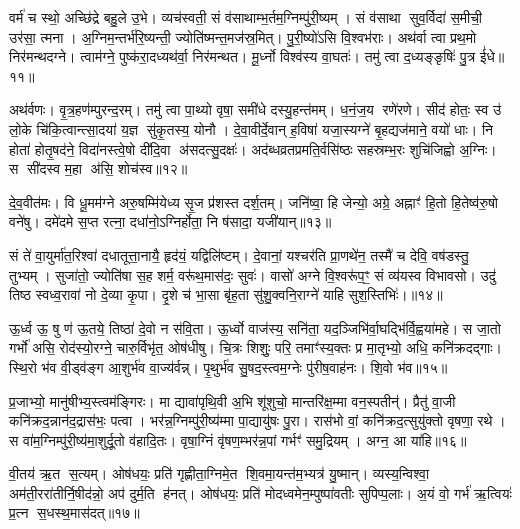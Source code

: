वर्म॑ च स्थो॒ अच्छि॑द्रे बहु॒ले उ॒भे। व्यच॑स्वती॒ सं व॑साथाम्भ॒र्तम॒ग्निम्पु॑री॒ष्यम्। सं व॑साथा सुव॒र्विदा॑ स॒मीची॒ उर॑सा॒ त्मना। अ॒ग्निम॒न्तर्भ॑रि॒ष्यन्ती॒ ज्योति॑ष्मन्त॒मज॑स्र॒मित्। पु॒री॒ष्यो॑ऽसि वि॒श्वभ॑राः। अथ॑र्वा त्वा प्रथ॒मो निर॑मन्थदग्ने। त्वाम॑ग्ने॒ पुष्क॑रा॒दध्यथ॑र्वा॒ निर॑मन्थत। मू॒र्ध्नो विश्व॑स्य वा॒घतः॑। तमु॑ त्वा द॒ध्यङ्ङृषिः॑ पु॒त्र ई॑धे॥११॥

अथ॑र्वणः। वृ॒त्र॒हण॑म्पुरन्द॒रम्। तमु॑ त्वा पा॒थ्यो वृषा॒ समी॑धे दस्यु॒हन्त॑मम्। ध॒नं॒ज॒य रणे॑रणे। सीद॑ होतः॒ स्व उ॑ लो॒के चि॑कि॒त्वान्त्सा॒दया॑ य॒ज्ञ सु॑कृ॒तस्य॒ योनौ। दे॒वा॒वीर्दे॒वान् ह॒विषा॑ यजा॒स्यग्ने॑ बृ॒हद्यज॑माने॒ वयो॑ धाः। नि होता॑ होतृ॒षद॑ने॒ विदा॑नस्त्वे॒षो दी॑दि॒वा अ॑सदत्सु॒दक्षः॑। अद॑ब्धव्रतप्रमति॒र्वसि॑ष्ठः सहस्रम्भ॒रः शुचि॑जिह्वो अ॒ग्निः। स सी॑दस्व म॒हा अ॑सि॒ शोच॑स्व॥१२॥

दे॒व॒वीत॑मः। वि धू॒मम॑ग्ने अरु॒षम्मि॑येध्य सृ॒ज प्र॑शस्त दर्\mbox{}श॒तम्। जनि॑ष्वा॒ हि जेन्यो॒ अग्रे॒ अह्नाꣳ॑ हि॒तो हि॒तेष्व॑रु॒षो वने॑षु। दमे॑दमे स॒प्त रत्ना॒ दधा॑नो॒ऽग्निर्\mbox{}होता॒ नि ष॑सादा॒ यजी॑यान्॥१३॥

{\anuvakamend[{स्थ॒ ई॒धे॒ शोच॑स्व स॒प्तविꣳ॑शतिश्च॥३॥}]}

सं ते॑ वा॒युर्मा॑त॒रिश्वा॑ दधातूत्ता॒नायै॒ हृद॑यं॒ यद्विलि॑ष्टम्। दे॒वानां॒ यश्चर॑ति प्रा॒णथे॑न॒ तस्मै॑ च देवि॒ वष॑डस्तु॒ तुभ्यम्। सुजा॑तो॒ ज्योति॑षा स॒ह शर्म॒ वरू॑थ॒मास॑दः॒ सुवः॑। वासो॑ अग्ने वि॒श्वरू॑प॒ꣳ॒ सं व्य॑यस्व विभावसो। उदु॑ तिष्ठ स्वध्व॒रावा॑ नो दे॒व्या कृ॒पा। दृ॒शे च॑ भा॒सा बृ॑ह॒ता सु॑शु॒क्वनि॒राग्ने॑ याहि सुश॒स्तिभिः॑।॥१४॥

ऊ॒र्ध्व ऊ॒ षु ण॑ ऊ॒तये॒ तिष्ठा॑ दे॒वो न स॑वि॒ता। ऊ॒र्ध्वो वाज॑स्य॒ सनि॑ता॒ यद॒ञ्जिभि॑र्वा॒घद्भि॑र्वि॒ह्वया॑महे। स जा॒तो गर्भो॑ असि॒ रोद॑स्यो॒रग्ने॒ चारु॒र्विभृ॑त॒ ओष॑धीषु। चि॒त्रः शिशुः॒ परि॒ तमाꣳ॑स्य॒क्तः प्र मा॒तृभ्यो॒ अधि॒ कनि॑क्रदद्गाः। स्थि॒रो भ॑व वी॒ड्व॑ङ्ग आ॒शुर्भ॑व वा॒ज्य॑र्वन्न्। पृ॒थुर्भ॑व सु॒षद॒स्त्वम॒ग्नेः पु॑रीष॒वाह॑नः। शि॒वो भ॑व॥१५॥

प्र॒जाभ्यो॒ मानु॑षीभ्य॒स्त्वम॑ङ्गिरः। मा द्यावा॑पृथि॒वी अ॒भि शू॑शुचो॒ मान्तरि॑क्ष॒म्मा वन॒स्पतीन्॑। प्रैतु॑ वा॒जी कनि॑क्रद॒न्नान॑द॒द्रास॑भः॒ पत्वा। भर॑न्न॒ग्निम्पु॑री॒ष्य॑म्मा पा॒द्यायु॑षः पु॒रा। रास॑भो वां॒ कनि॑क्रद॒त्सुयु॑क्तो वृषणा॒ रथे। स वा॑म॒ग्निम्पु॑री॒ष्य॑मा॒शुर्दू॒तो व॑हादि॒तः। वृषा॒ग्निं वृ॑षण॒म्भर॑न्न॒पां गर्भꣳ॑ समु॒द्रियम्। अग्न॒ आ या॑हि॥१६॥

वी॒तय॑ ऋ॒त स॒त्यम्। ओष॑धयः॒ प्रति॑ गृह्णीता॒ग्निमे॒त शि॒वमा॒यन्त॑म॒भ्यत्र॑ यु॒ष्मान्। व्यस्य॒न्विश्वा॒ अम॑ती॒ररा॑तीर्नि॒षीद॑न्नो॒ अप॑ दुर्म॒ति ह॑नत्। ओष॑धयः॒ प्रति॑ मोदध्वमेन॒म्पुष्पा॑वतीः सुपिप्प॒लाः। अ॒यं वो॒ गर्भ॑ ऋ॒त्वियः॑ प्र॒त्न स॒धस्थ॒मास॑दत्॥१७॥

